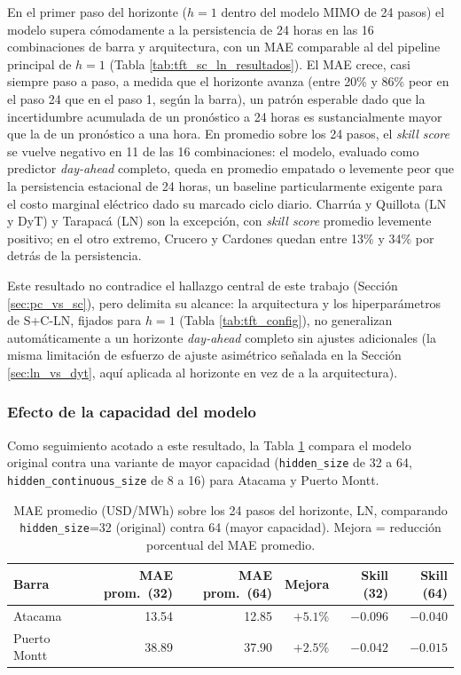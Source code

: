En el primer paso del horizonte ($h=1$ dentro del modelo MIMO de 24 pasos) el modelo supera cómodamente a la persistencia de 24 horas en las 16 combinaciones de barra y arquitectura, con un MAE comparable al del pipeline principal de $h=1$ (Tabla \ref{tab:tft_sc_ln_resultados}). El MAE crece, casi siempre paso a paso, a medida que el horizonte avanza (entre 20\% y 86\% peor en el paso 24 que en el paso 1, según la barra), un patrón esperable dado que la incertidumbre acumulada de un pronóstico a 24 horas es sustancialmente mayor que la de un pronóstico a una hora. En promedio sobre los 24 pasos, el \textit{skill score} se vuelve negativo en 11 de las 16 combinaciones: el modelo, evaluado como predictor \textit{day-ahead} completo, queda en promedio empatado o levemente peor que la persistencia estacional de 24 horas, un baseline particularmente exigente para el costo marginal eléctrico dado su marcado ciclo diario. Charrúa y Quillota (LN y DyT) y Tarapacá (LN) son la excepción, con \textit{skill score} promedio levemente positivo; en el otro extremo, Crucero y Cardones quedan entre 13\% y 34\% por detrás de la persistencia.

Este resultado no contradice el hallazgo central de este trabajo (Sección \ref{sec:pc_vs_sc}), pero delimita su alcance: la arquitectura y los hiperparámetros de S+C-LN, fijados para $h=1$ (Tabla \ref{tab:tft_config}), no generalizan automáticamente a un horizonte \textit{day-ahead} completo sin ajustes adicionales (la misma limitación de esfuerzo de ajuste asimétrico señalada en la Sección \ref{sec:ln_vs_dyt}, aquí aplicada al horizonte en vez de a la arquitectura).

\subsubsection{Efecto de la capacidad del modelo}

Como seguimiento acotado a este resultado, la Tabla \ref{tab:h24_bigcap} compara el modelo original contra una variante de mayor capacidad (\texttt{hidden\_size} de 32 a 64, \texttt{hidden\_continuous\_size} de 8 a 16) para Atacama y Puerto Montt.

\begin{table}[htbp]
    \centering
    \begin{tabular}{lrrrrr}
        \toprule
        Barra & MAE prom.\ (32) & MAE prom.\ (64) & Mejora & Skill (32) & Skill (64) \\
        \midrule
        Atacama      & 13.54 & 12.85 & $+5.1\%$ & $-0.096$ & $-0.040$ \\
        Puerto Montt & 38.89 & 37.90 & $+2.5\%$ & $-0.042$ & $-0.015$ \\
        \bottomrule
    \end{tabular}
    \vspace{0.2cm}
    \caption{MAE promedio (USD/MWh) sobre los 24 pasos del horizonte, LN, comparando \texttt{hidden\_size}=32 (original) contra 64 (mayor capacidad). Mejora = reducción porcentual del MAE promedio.}
    \label{tab:h24_bigcap}
\end{table}


